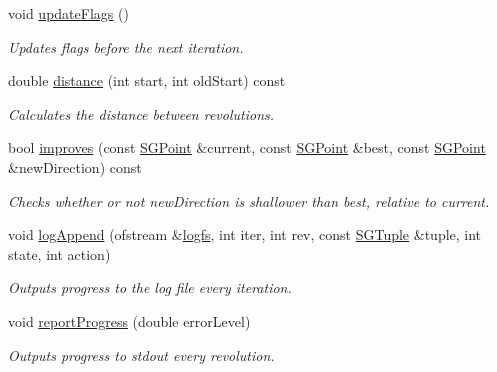 \begin{DoxyCompactItemize}
void \hyperlink{classSGApproximation_a5be5179421280098d416c2d32a44fe35}{update\-Flags} ()
\begin{DoxyCompactList}\small\item\em Updates flags before the next iteration. \end{DoxyCompactList}\item 
double \hyperlink{classSGApproximation_a44ce692aa3e9381c0c4522d51145dab8}{distance} (int start, int old\-Start) const 
\begin{DoxyCompactList}\small\item\em Calculates the distance between revolutions. \end{DoxyCompactList}\item 
bool \hyperlink{classSGApproximation_a793cc931c160864ef42bdbc47662ace9}{improves} (const \hyperlink{classSGPoint}{S\-G\-Point} \&current, const \hyperlink{classSGPoint}{S\-G\-Point} \&best, const \hyperlink{classSGPoint}{S\-G\-Point} \&new\-Direction) const 
\begin{DoxyCompactList}\small\item\em Checks whether or not new\-Direction is shallower than best, relative to current. \end{DoxyCompactList}\item 
\hypertarget{classSGApproximation_abee7788a5c23d632d249bc82f6d0fad4}{void \hyperlink{classSGApproximation_abee7788a5c23d632d249bc82f6d0fad4}{log\-Append} (ofstream \&\hyperlink{classSGApproximation_a3c938c255cddce7cc0483e223bf09b65}{logfs}, int iter, int rev, const \hyperlink{classSGTuple}{S\-G\-Tuple} \&tuple, int state, int action)}\label{classSGApproximation_abee7788a5c23d632d249bc82f6d0fad4}

\begin{DoxyCompactList}\small\item\em Outputs progress to the log file every iteration. \end{DoxyCompactList}\item 
\hypertarget{classSGApproximation_a44eb18d812af7613820ac4a18fae20ac}{void \hyperlink{classSGApproximation_a44eb18d812af7613820ac4a18fae20ac}{report\-Progress} (double error\-Level)}\label{classSGApproximation_a44eb18d812af7613820ac4a18fae20ac}

\begin{DoxyCompactList}\small\item\em Outputs progress to stdout every revolution. \end{DoxyCompactList}\end{DoxyCompactItemize}
